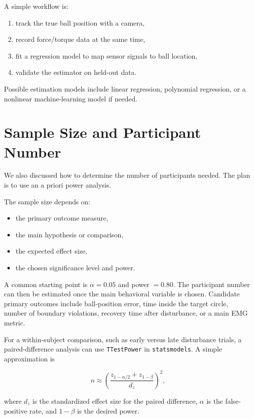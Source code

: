 \documentclass[11pt, a4paper]{article}
\begin{document}
A simple workflow is:

\begin{enumerate}[nosep]
  \item track the true ball position with a camera,
  \item record force/torque data at the same time,
  \item fit a regression model to map sensor signals to ball location,
  \item validate the estimator on held-out data.
\end{enumerate}

Possible estimation models include linear regression, polynomial regression, or a nonlinear machine-learning model if needed.

\section{Sample Size and Participant Number}

We also discussed how to determine the number of participants needed. The plan is to use an a priori power analysis.

The sample size depends on:

\begin{itemize}[nosep]
  \item the primary outcome measure,
  \item the main hypothesis or comparison,
  \item the expected effect size,
  \item the chosen significance level and power.
\end{itemize}

A common starting point is $\alpha = 0.05$ and power $= 0.80$. The participant number can then be estimated once the main behavioral variable is chosen. Candidate primary outcomes include ball-position error, time inside the target circle, number of boundary violations, recovery time after disturbance, or a main EMG metric.

For a within-subject comparison, such as early versus late disturbance trials, a paired-difference analysis can use
\texttt{TTestPower} in \texttt{statsmodels}.
A simple approximation is

\begin{equation}
  n \approx \left( \frac{z_{1-\alpha/2} + z_{1-\beta}}{d_z} \right)^2,
\end{equation}

where $d_z$ is the standardized effect size for the paired difference, $\alpha$ is the false-positive rate, and $1-\beta$ is the desired power.
\end{document}
